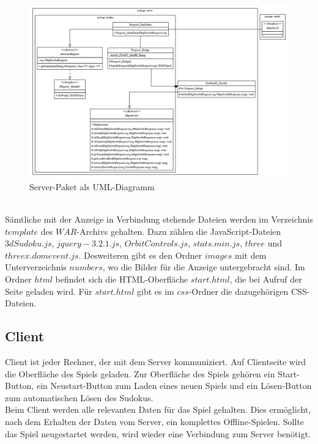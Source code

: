 \documentclass[a4paper,12pt]{scrreprt}
\begin{document}
	\begin{figure}
		\includegraphics[scale=0.55]{pictures/controller}
		\caption{Server-Paket als UML-Diagramm}
	\end{figure}\medskip \\
	S\"amtliche mit der Anzeige in Verbindung stehende Dateien werden im Verzeichnis $template$ des
	$WAR$-Archivs gehalten. Dazu z\"ahlen die JavaScript-Dateien $3dSudoku.js$, $jquery-3.2.1.js$,
	$OrbitControls.js$, $stats.min.js$, $three$ und $threex.domevent.js$. Desweiteren gibt es den Ordner
	$images$ mit dem Unterverzeichnis $numbers$, wo die Bilder f\"ur die Anzeige untergebracht sind.
	Im Ordner $html$ befindet sich die HTML-Oberfl\"ache $start.html$, die bei Aufruf der Seite geladen wird.
	F\"ur $start.html$ gibt es im $css$-Ordner die dazugeh\"origen CSS-Dateien.\medskip \\

	\subsection{Client}
	Client ist jeder Rechner, der mit dem Server kommuniziert. Auf Clientseite wird die Oberfl\"ache des
	Spiels geladen. Zur Oberfl\"ache des Spiels geh\"oren ein Start-Button, ein Neustart-Button zum
	Laden eines neuen Spiels und ein L\"osen-Button zum automatischen L\"osen des Sudokus.\medskip \\
	Beim Client werden alle relevanten Daten f\"ur das Spiel gehalten. Dies ermöglicht, nach dem
	Erhalten der Daten vom Server, ein komplettes Offline-Spielen. Sollte das Spiel neugestartet werden,
	wird wieder eine Verbindung zum Server ben\"otigt.
\end{document}
